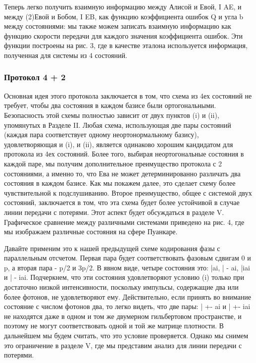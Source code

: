 Теперь легко получить взаимную информацию между Алисой и Евой, I AE, и между (2)Евой и Бобом, I EB, как функцию коэффициента ошибок Q и угла b между состояниями: мы также можем записать взаимную информацию как функцию скорости передачи для каждого значения коэффициента ошибок. Эти функции построены на рис. 3, где в качестве эталона используется информация, полученная для системы из 4 состояний.

\subsubsection{Протокол 4 + 2}

Основная идея этого протокола заключается в том, что схема из 4ех состояний не требует, чтобы два состояния в каждом базисе были ортогональными. Безопасность этой схемы полностью зависит от двух пунктов (i) и (ii), упомянутых в Разделе II. Любая схема, использующая две пары состояний (каждая пара соответствует одному неортонормальному базису), удовлетворяющая и (i), и (ii), является одинаково хорошим кандидатом для протокола из 4ех состояний. Более того, выбирая неортогональные состояния в каждой паре, мы получим дополнительное преимущество протокола с 2 состояниями, а именно то, что Ева не может детерминированно различать два состояния в каждом базисе. Как мы покажем далее, это сделает схему более чувствительной к подслушиванию. Второе преимущество, общее с системой двух состояний, заключается в том, что эта схема будет более устойчивой в случае линии передачи с потерями. Этот аспект будет обсуждаться в разделе V. Графическое сравнение между различными системами приведено на рис. 4, где мы изображаем различные состояния на сфере Пуанкаре.

Давайте применим это к нашей предыдущей схеме кодирования фазы с параллельным отсчетом. Первая пара будет соответствовать фазовым сдвигам 0 и p, а вторая пара - p/2 и 3p/2. В явном виде, четыре состояния это: |ai, | - ai, |iai и | - iai. Подчеркнем, что эти состояния удовлетворяют условию (i) только при достаточно низкой интенсивности, поскольку импульсы, содержащие два или более фотонов, не удовлетворяют ему. Действительно, если принять во внимание состояние с числом фотонов два, то легко видеть, что две пары: | +- ai и | +- iai не находятся даже в одном и том же двумерном гильбертовом пространстве, и поэтому не могут соответствовать одной и той же матрице плотности. В дальнейшем мы будем считать, что это условие проверяется. Однако мы снимем это ограничение в разделе V, где мы представим анализ для линии передачи с потерями.

